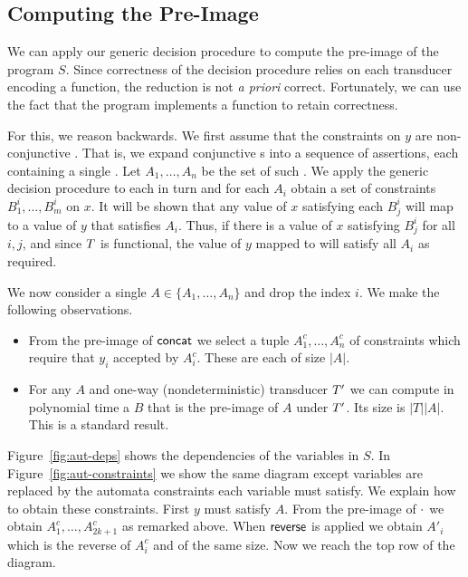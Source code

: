 {\subsection{Computing the Pre-Image}

We can apply our generic decision procedure to compute the pre-image of the
program $S$.
%
Since correctness of the decision procedure relies on each transducer encoding
a function, the reduction is not \textit{a priori} correct.
%
Fortunately, we can use the fact that the program implements a function to
retain correctness.

For this, we reason backwards.
%
We first assume that the constraints on $y$ are non-conjunctive \FA{}.
%
That is, we expand conjunctive \FA{}s into a sequence of assertions, each
containing a single \FA{}.
%
Let $A_1, \ldots, A_n$ be the set of such \FA{}.
%
We apply the generic decision procedure to each \FA{} in turn and for each
$A_i$ obtain a set of constraints
$B^i_1, \ldots, B^i_m$
on $x$.
%
It will be shown that any value of $x$ satisfying each $B^i_j$ will map to a
value of $y$ that satisfies $A_i$.
%
Thus, if there is a value of $x$ satisfying $B^i_j$ for all $i, j$, and since
$T$ is functional, the value of $y$ mapped to will satisfy all $A_i$
as required.

We now consider a single
$A \in \{A_1, \ldots, A_n\}$
and drop the index $i$.
%
We make the following observations.
\begin{itemize}
\item
    From the pre-image of $\mathsf{concat}$ we select a tuple
    $A^c_1, \ldots, A^c_n$
    of constraints which require that $y_i$ accepted by $A^c_i$.
    These are each of size $|A|$.
\item
    For any \FA{} $A$ and one-way (nondeterministic) transducer $T'$
    we can compute in polynomial time a \FA{} $B$ that is the pre-image of $A$
    under $T'$.
    Its size is $|T||A|$.
    This is a standard result.
\end{itemize}
%
Figure~\ref{fig:aut-deps} shows the dependencies of the variables in $S$.
%
In Figure~\ref{fig:aut-constraints} we show the same diagram except variables
are replaced by the automata constraints each variable must satisfy.
%
We explain how to obtain these constraints.
%
First $y$ must satisfy $A$.
%
From the pre-image of $\cdot$ we obtain
$A^c_1, \ldots, A^c_{2k+1}$
as remarked above.
%
When $\mathsf{reverse}$ is applied we obtain $A'_i$ which is the reverse of $A^c_i$ and of the same size.
%
Now we reach the top row of the diagram.

}
